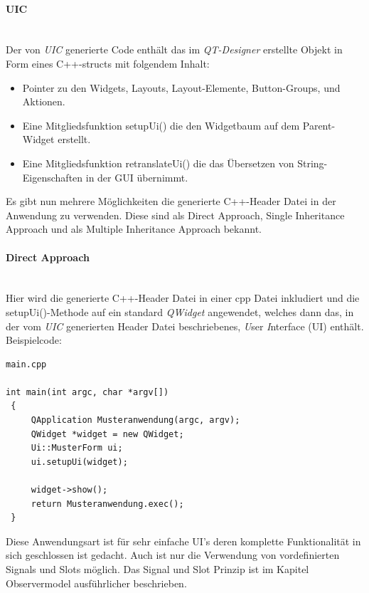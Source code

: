 \paragraph{UIC}\mbox{}\\
Der von \textit{UIC} generierte Code enthält das im \textit{QT-Designer} erstellte Objekt in Form eines C++-structs mit folgendem Inhalt:
\begin{itemize}
	\item Pointer zu den Widgets, Layouts, Layout-Elemente, Button-Groups, und Aktionen.
	\item Eine Mitgliedsfunktion setupUi() die den Widgetbaum auf dem Parent-Widget erstellt.
	\item Eine Mitgliedsfunktion retranslateUi() die das Übersetzen von String-Eigenschaften in der GUI übernimmt.
\end{itemize}
Es gibt nun mehrere Möglichkeiten die generierte C++-Header Datei in der Anwendung zu verwenden. Diese sind als Direct Approach, Single Inheritance
Approach und als Multiple Inheritance Approach bekannt.

\paragraph{Direct Approach}\mbox{}\\
Hier wird die generierte C++-Header Datei in einer cpp Datei inkludiert und die setupUi()-Methode auf ein standard \textit{QWidget} angewendet, welches dann das, in der vom \textit{UIC} generierten Header Datei beschriebenes, \textit{U}ser \textit{I}nterface (UI) enthält.\\Beispielcode:
\begin{lstlisting}
main.cpp

int main(int argc, char *argv[])
 {
     QApplication Musteranwendung(argc, argv);
     QWidget *widget = new QWidget;
     Ui::MusterForm ui;
     ui.setupUi(widget);

     widget->show();
     return Musteranwendung.exec();
 }
\end{lstlisting}
Diese Anwendungsart ist für sehr einfache UI’s deren komplette Funktionalität in sich geschlossen ist gedacht. Auch ist nur die Verwendung von vordefinierten Signals und Slots möglich. Das Signal und Slot Prinzip ist im Kapitel Observermodel ausführlicher beschrieben.
\newpage
